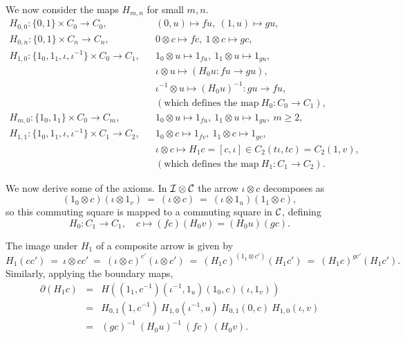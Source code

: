 \newpage
We now consider the maps $H_{m,n}$ for small $m,n$. 
\begin{eqnarray*}
H_{0,0} : \{0,1\}\times C_0 \to C_0,  
  &&  (0,u) \mapsto fu,~ (1,u) \mapsto gu, \\
H_{0,n} : \{0,1\}\times C_n \to C_n,  
  &&  0 \otimes c \mapsto fc,~ 1 \otimes c \mapsto gc, \\
H_{1,0} : \{1_0,1_1,\iota,\iota^{-1}\}\times C_0 \to C_1,  
  &&  1_0 \otimes u \mapsto 1_{fu},~ 1_1 \otimes u \mapsto 1_{gu}, \\
  &&  \iota \otimes u \mapsto (H_0 u : fu \to gu), \\
  &&  \iota^{-1} \otimes u \mapsto (H_0 u)^{-1} : gu \to fu, \\
  &&  (\text{which defines the map}~ H_0 : C_0 \to C_1), \\
H_{m,0} : \{1_0,1_1\}\times C_0 \to C_m,  
  &&  1_0 \otimes u \mapsto 1_{fu},~ 1_1 \otimes u \mapsto 1_{gu},~ 
        m \geqslant 2, \\
H_{1,1} : \{1_0,1_1,\iota,\iota^{-1}\}\times C_1 \to C_2,  
  &&  1_0 \otimes c \mapsto 1_{fv},~ 1_1 \otimes c \mapsto 1_{gv}, \\
  &&  \iota \otimes c \mapsto H_1 c = [c,\iota] 
        \in C_2(t\iota, tc) = C_2(1,v), \\
  &&  (\text{which defines the map}~ H_1 : C_1 \to C_2).
\end{eqnarray*}

We now derive some of the axioms. 
In $\mathcal{I}\otimes\mathcal{C}$ the arrow $\iota \otimes c$ decomposes as
$$
(1_0 \otimes c)(\iota \otimes 1_v) 
~=~ (\iota \otimes c) ~=~ (\iota \otimes 1_u)(1_1 \otimes c), 
$$
so this commuting square is mapped to a commuting square in $\mathcal{C}$, defining 
$$
H_0 : C_1 \to C_1,\quad  c \mapsto (fc)(H_0 v) = (H_0 u)(gc). 
$$

\noindent
The image under $H_1$ of a composite arrow is given by 
$$
H_1(cc') ~=~ \iota \otimes cc' 
           ~=~ (\iota \otimes c)^{c'}(\iota \otimes c') 
           ~=~ (H_1 c)^{(1_1 \otimes c')}(H_1 c') 
           ~=~ (H_1 c)^{gc'}(H_1 c').
$$
Similarly, applying the boundary maps, 
\begin{eqnarray*}
\partial(H_1 c) 
  &=&  H\left((1_1,c^{-1})(\iota^{-1},1_u)(1_0,c)(\iota,1_v)\right) \\
  &=&  H_{0,1}(1,c^{-1})\ H_{1,0}(\iota^{-1},u)\ 
       H_{0,1}(0,c)\      H_{1,0}(\iota,v) \\ 
  &=&  (gc)^{-1}\ (H_0 u)^{-1}\ (fc)\ (H_0 v).
\end{eqnarray*}


